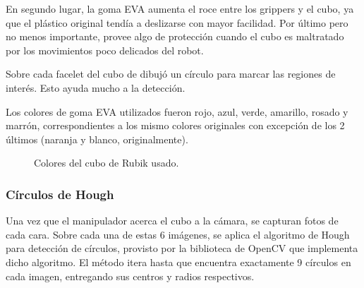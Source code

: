 En segundo lugar, la goma EVA aumenta el roce entre los grippers y el cubo, ya que el plástico original tendía a deslizarse con mayor facilidad. Por último pero no menos importante, provee algo de protección cuando el cubo es maltratado por los movimientos poco delicados del robot.

Sobre cada facelet del cubo de dibujó un círculo para marcar las regiones de interés. Esto ayuda mucho a la detección.

Los colores de goma EVA utilizados fueron rojo, azul, verde, amarillo, rosado y marrón, correspondientes a los mismo colores originales con excepción de los 2 últimos (naranja y blanco, originalmente).

\begin{figure}[h!]
	\centering
	\caption{Colores del cubo de Rubik usado.}
	\label{colorescubo}
\end{figure}

\subsubsection{Círculos de Hough}
Una vez que el manipulador acerca el cubo a la cámara, se capturan fotos de cada cara. Sobre cada una de estas $6$ imágenes, se aplica el algoritmo de Hough para detección de círculos, provisto por la biblioteca de OpenCV que implementa dicho algoritmo. El método itera hasta que encuentra exactamente 9 círculos en cada imagen, entregando sus centros y radios respectivos.

